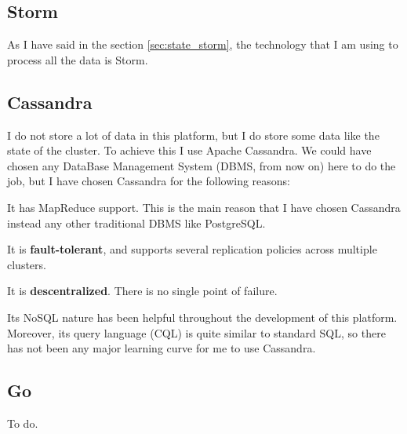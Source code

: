 \subsection{Storm}

As I have said in the section \ref{sec:state_storm}, the technology that I am
using to process all the data is Storm.

\subsection{Cassandra}
\label{sec:cassandra}

I do not store a lot of data in this platform, but I do store some data like
the state of the cluster. To achieve this I use Apache Cassandra. We could
have chosen any DataBase Management System (DBMS, from now on) here to do the
job, but I have chosen Cassandra for the following reasons:

\mylist
  \item It has MapReduce support. This is the main reason that I have chosen
Cassandra instead any other traditional DBMS like PostgreSQL.
  \item It is {\bf fault-tolerant}, and supports several replication policies
across multiple clusters.
  \item It is {\bf descentralized}. There is no single point of failure.
  \item Its NoSQL nature has been helpful throughout the development of this
platform. Moreover, its query language (CQL) is quite similar to standard SQL,
so there has not been any major learning curve for me to use Cassandra.
\mylistend

\subsection{Go}
\label{sec:go}

To do.
